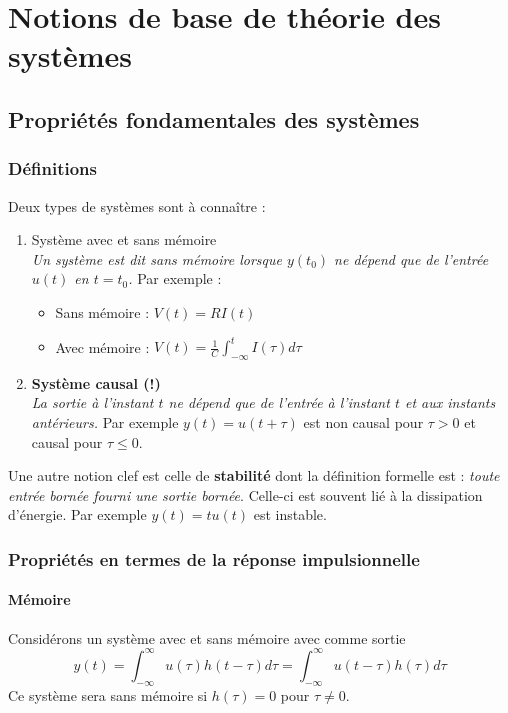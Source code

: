 \chapter{Notions de base de théorie des systèmes}

\section{Propriétés fondamentales des systèmes}
	\subsection{Définitions}
	Deux types de systèmes sont à connaître :
	\begin{enumerate}
	\item Système avec et sans mémoire\\
	\textit{Un système est dit sans mémoire lorsque $y(t_0)$ ne dépend que de l'entrée 
	$u(t)$ en $t=t_0$.} Par exemple :
		\begin{itemize}
		\item Sans mémoire : $V(t) = RI(t)$
		\item Avec mémoire : $V(t) = \frac{1}{C}\int_{-\infty}^t I(\tau)d\tau$
		\end{itemize}
	\item \textbf{Système causal (!)}\\
	\textit{La sortie à l'instant $t$ ne dépend que de l'entrée à l'instant $t$ et aux 
	instants antérieurs.} Par exemple $y(t) = u(t+\tau)$ est non causal pour $
	\tau > 0$ et causal pour $\tau\leq0$.
	\end{enumerate}
	
	Une autre notion clef est celle de \textbf{stabilité} dont la définition formelle 
	est : \textit{toute entrée bornée fourni une sortie bornée}. Celle-ci est souvent
	lié à la dissipation d'énergie. Par exemple $y(t) = tu(t)$ est instable.




	\subsection{Propriétés en termes de la réponse impulsionnelle}
		\subsubsection{Mémoire}
	Considérons un système avec et sans mémoire avec comme sortie 
	\begin{equation}
	y(t) = \int_{-\infty}^\infty u(\tau)h(t-\tau)d\tau = \int_{-\infty}^\infty u(t-\tau)
	h(\tau)d\tau
	\end{equation}
	Ce système sera sans mémoire si $h(\tau) = 0$ pour $\tau \neq 0$.\\
	
